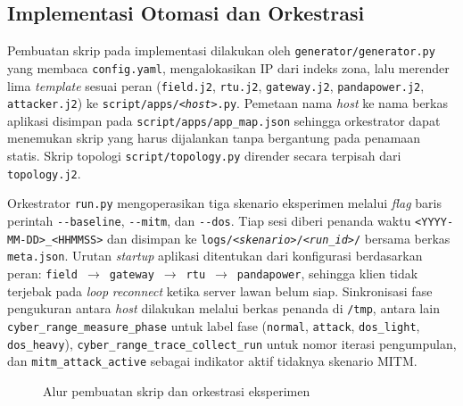 \subsection{Implementasi Otomasi dan Orkestrasi}
\label{subsec:implementasi_otomasi_dan_orkestrasi}
Pembuatan skrip pada implementasi dilakukan oleh \texttt{generator/generator.py} yang membaca \texttt{config.yaml}, mengalokasikan IP dari indeks zona, lalu merender lima \textit{template} sesuai peran (\texttt{field.j2}, \texttt{rtu.j2}, \texttt{gateway.j2}, \texttt{pandapower.j2}, \texttt{attacker.j2}) ke \texttt{script/apps/\textit{<host>}.py}. Pemetaan nama \textit{host} ke nama berkas aplikasi disimpan pada \texttt{script/apps/app\_map.json} sehingga orkestrator dapat menemukan skrip yang harus dijalankan tanpa bergantung pada penamaan statis. Skrip topologi \texttt{script/topology.py} dirender secara terpisah dari \texttt{topology.j2}.

Orkestrator \texttt{run.py} mengoperasikan tiga skenario eksperimen melalui \textit{flag} baris perintah \texttt{-{}-baseline}, \texttt{-{}-mitm}, dan \texttt{-{}-dos}. Tiap sesi diberi penanda waktu \texttt{<YYYY-MM-DD>\_<HHMMSS>} dan disimpan ke \texttt{logs/\textit{<skenario>}/\textit{<run\_id>}/} bersama berkas \texttt{meta.json}. Urutan \textit{startup} aplikasi ditentukan dari konfigurasi berdasarkan peran: \texttt{field}~$\rightarrow$~\texttt{gateway}~$\rightarrow$~\texttt{rtu}~$\rightarrow$~\texttt{pandapower}, sehingga klien tidak terjebak pada \textit{loop} \textit{reconnect} ketika server lawan belum siap. Sinkronisasi fase pengukuran antara \textit{host} dilakukan melalui berkas penanda di \texttt{/tmp}, antara lain \texttt{cyber\_range\_measure\_phase} untuk label fase (\texttt{normal}, \texttt{attack}, \texttt{dos\_light}, \texttt{dos\_heavy}), \texttt{cyber\_range\_trace\_collect\_run} untuk nomor iterasi pengumpulan, dan \texttt{mitm\_attack\_active} sebagai indikator aktif tidaknya skenario \ac{MITM}.

\begin{figure}[htbp]
    \centering
    \caption{Alur pembuatan skrip dan orkestrasi eksperimen}
    \label{fig:impl_orchestration_flow}
\end{figure}


